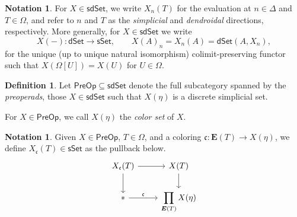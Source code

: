 \documentclass[a4paper,10pt
,draft
]{article}%
\numberwithin{equation}{section}
\numberwithin{figure}{section}
\theoremstyle{definition} %
\newtheorem{definition}[equation]{Definition}%
\newtheorem{notation}[equation]{Notation}%
\newcommand{\sSet}{\ensuremath{\mathsf{sSet}}}%
\newcommand{\dSet}{\mathsf{dSet}}
\newcommand{\sdSet}{\mathsf{sdSet}}
\newcommand{\PreOp}{\mathsf{PreOp}}
\newcommand{\1}{\ensuremath{\mathbbm 1}}%
\begin{document}
\begin{notation}
        For $X \in \sdSet$, we write $X_n(T)$ for the evaluation at $n \in \Delta$ and $T \in \Omega$,
        and refer to $n$ and $T$ as the \textit{simplicial} and \textit{dendroidal} directions, respectively.
        More generally, for $X \in \sdSet$ we write
        \begin{equation}
                \label{SDSET_EQ}
                X(-) \colon \dSet \to \sSet,
                \qquad
                X(A)_n = X_n(A) = \dSet(A, X_n),
        \end{equation}
        for the unique (up to unique natural isomorphism) colimit-preserving functor
        such that
        $X\left(\Omega[U]\right) = X(U)$ for
        $U \in \Omega$.
\end{notation}

\begin{definition}
        Let $\PreOp \subseteq \sdSet$ denote the full subcategory spanned by the \textit{preoperads},
        those $X \in \sdSet$ such that $X(\eta)$ is a discrete simplicial set.

        For $X \in \PreOp$, we call $X(\eta)$ the \textit{color set} of $X$.
\end{definition}

\begin{notation}
        Given $X \in \PreOp$, $T \in \Omega$, and a coloring $\mathfrak c \colon \boldsymbol{E}(T) \to X(\eta)$,
        we define $X_{\mathfrak c}(T) \in \sSet$ as the pullback below.
        \begin{equation}
                \label{XUDECALT EQ}
                \begin{tikzcd}
                        X_{\mathfrak c}(T) \arrow[r] \arrow[d]
                        &
                        X(T) \arrow[d]
                        \\
                        \** \arrow[r, "\mathfrak c"]
                        &
                        \displaystyle{
                          \prod\limits_{\boldsymbol{E}(T)} X(\eta)
                        }
                \end{tikzcd}
        \end{equation}
\end{notation}
\end{document}
